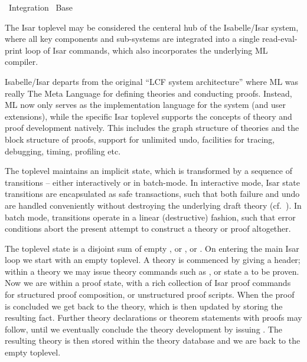 %
\begin{isabellebody}%
\def\isabellecontext{Integration}%
%
\isadelimtheory
%
\endisadelimtheory
%
\isatagtheory
{}\isamarkupfalse%
\ Integration\isanewline
{}\ Base\isanewline
{}%
\endisatagtheory
{\isafoldtheory}%
%
\isadelimtheory
%
\endisadelimtheory
%
\isamarkuptrue%
%
\isamarkuptrue%
%
\begin{isamarkuptext}%
The Isar toplevel may be considered the centeral hub of the
  Isabelle/Isar system, where all key components and sub-systems are
  integrated into a single read-eval-print loop of Isar commands,
  which also incorporates the underlying ML compiler.

  Isabelle/Isar departs from the original ``LCF system architecture''
  where ML was really The Meta Language for defining theories and
  conducting proofs.  Instead, ML now only serves as the
  implementation language for the system (and user extensions), while
  the specific Isar toplevel supports the concepts of theory and proof
  development natively.  This includes the graph structure of theories
  and the block structure of proofs, support for unlimited undo,
  facilities for tracing, debugging, timing, profiling etc.

  \medskip The toplevel maintains an implicit state, which is
  transformed by a sequence of transitions -- either interactively or
  in batch-mode.  In interactive mode, Isar state transitions are
  encapsulated as safe transactions, such that both failure and undo
  are handled conveniently without destroying the underlying draft
  theory (cf.~).  In batch mode,
  transitions operate in a linear (destructive) fashion, such that
  error conditions abort the present attempt to construct a theory or
  proof altogether.

  The toplevel state is a disjoint sum of empty , or
  , or .  On entering the main Isar loop we
  start with an empty toplevel.  A theory is commenced by giving a
   header; within a theory we may issue theory
  commands such as , or state a  to be proven.  Now we are within a proof state, with a
  rich collection of Isar proof commands for structured proof
  composition, or unstructured proof scripts.  When the proof is
  concluded we get back to the theory, which is then updated by
  storing the resulting fact.  Further theory declarations or theorem
  statements with proofs may follow, until we eventually conclude the
  theory development by issuing .  The resulting theory
  is then stored within the theory database and we are back to the
  empty toplevel.


\end{isamarkuptext}
\end{isabellebody}
